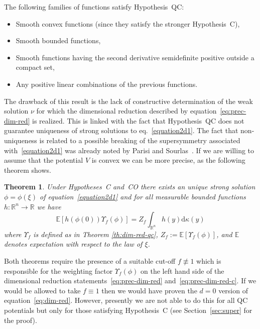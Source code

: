 \documentclass[a4paper,10pt]{article}
\newcommand{\assign}{:=}
\newcommand{\mathd}{\mathrm{d}}
\newcommand{\nequiv}[0]{\not\equiv}
\newenvironment{itemizedot}{\begin{itemize} \renewcommand{\labelitemi}{$\bullet$}\renewcommand{\labelitemii}{$\bullet$}\renewcommand{\labelitemiii}{$\bullet$}\renewcommand{\labelitemiv}{$\bullet$}}{\end{itemize}}
\newtheorem{theorem}{Theorem}
\begin{document}
\begin{remark}
  The following families of functions satisfy Hypothesis~QC:
  \begin{itemizedot}
    \item Smooth convex functions (since they satisfy the stronger
    Hypothesis~C),
    
    \item Smooth bounded functions,
    
    \item Smooth functions having the second derivative semidefinite positive
    outside a compact set,
    
    \item Any positive linear combinations of the previous functions.
  \end{itemizedot}
\end{remark}

The drawback of this result is the lack of constructive determination of the
weak solution $\nu$ for which the dimensional reduction described by
equation~{\eqref{eq:prec-dim-red}} is realized. This is linked with the fact
that Hypothesis~QC does not guarantee uniqueness of strong solutions to
eq.~{\eqref{equation2d1}}. The fact that non-uniqueness is related to a
possible breaking of the supersymmetry associated with~{\eqref{equation2d1}}
was already noted by Parisi and Sourlas~{\cite{parisi_supersymmetric_1982}}.
If we are willing to assume that the potential $V$ is convex we can be more
precise, as the following theorem shows.

\begin{theorem}
  \label{th:dim-red-1}Under Hypotheses~C and~CO there exists an unique strong
  solution $\phi = \phi (\xi)$ of equation~{\eqref{equation2d1}} and for all
  measurable bounded functions $h : \mathbb{R}^n \rightarrow \mathbb{R}$ we
  have
  \begin{equation}
    \mathbb{E} [h (\phi (0)) \Upsilon_f (\phi)] = Z_f \int_{\mathbb{R}^n} h
    (y) \mathd \kappa (y) \label{eq:prec-dim-red-c}
  \end{equation}
  where $\Upsilon_f$ is defined as in Theorem \ref{th:dim-red-qc}, $Z_f
  \assign \mathbb{E} [\Upsilon_f (\phi)]$, and $\mathbb{E}$ denotes
  expectation with respect to the law of $\xi$.
\end{theorem}

Both theorems require the presence of a suitable cut-off $f \nequiv 1$ which
is responsible for the weighting factor $\Upsilon_f (\phi)$ on the left hand
side of the dimensional reduction statements~{\eqref{eq:prec-dim-red}}
and~{\eqref{eq:prec-dim-red-c}}. If we would be allowed to take $f \equiv 1$
then we would have proven the $d = 0$ version of
equation~{\eqref{eq:dim-red}}. However, presently we are not able to do this
for all QC potentials but only for those satisfying Hypothesis~C (see
Section~\ref{sec:super} for the proof). \
\end{document}
